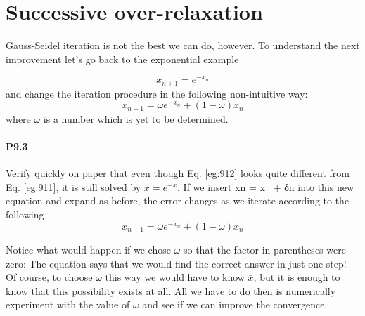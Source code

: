 \documentclass{book}
\theoremstyle{plain}
\theoremstyle{definition}
\numberwithin{exm}{chapter}
\theoremstyle{remark}
\theoremstyle{summary}
\theoremstyle{overview}
\begin{document}
\section*{Successive over-relaxation}
Gauss-Seidel iteration is not the best we can do, however. To understand the next
improvement let\rq s go back to the exponential example

\begin{equation}\label{eq:911}
x_{n+1}=e^{-x_{n}}
\end{equation}
and change the iteration procedure in the following non-intuitive way:
\begin{equation}\label{eq:912}
x_{n+1}=\omega e^{-x_{n}}+(1-\omega) x_{n}
\end{equation}
where $\omega$ is a number which is yet to be determined.
\paragraph*{P9.3} Verify quickly on paper that even though Eq. \eqref{eg:912} looks quite different
from Eq. \eqref{eg:911}, it is still solved by $x = e^{-x}$.
If we insert xn = x¯ + δn into this new equation and expand as before, the error
changes as we iterate according to the following
\begin{equation}\label{eq:913}
x_{n+1}=\omega e^{-x_{n}}+(1-\omega) x_{n}
\end{equation}

Notice what would happen if we chose $\omega$ so that the factor in parentheses were
zero: The equation says that we would find the correct answer in just one step! Of
course, to choose $\omega$ this way we would have to know $\bar{x}$, but it is enough to know
that this possibility exists at all. All we have to do then is numerically experiment
with the value of $\omega$ and see if we can improve the convergence.
\end{document}
